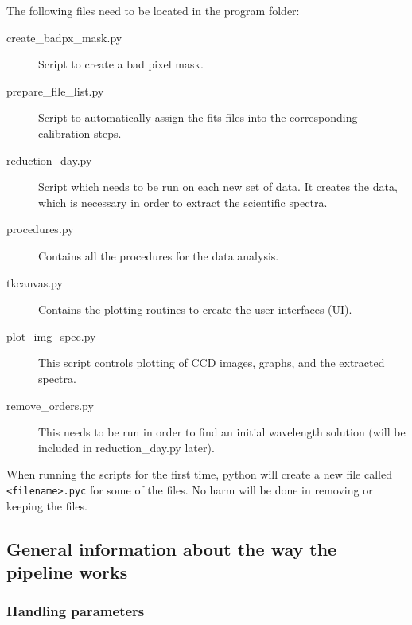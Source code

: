 \documentclass[10pt,a4paper]{article}
\begin{document}
\noindent The following files need to be located in the program folder:
\begin{description}
\item[create\_badpx\_mask.py] Script to create a bad pixel mask.
\item[prepare_file_list.py] Script to automatically assign the fits files into the corresponding calibration steps.
\item[reduction\_day.py] Script which needs to be run on each new set of data. It creates the data, which is necessary in order to extract the scientific spectra.
\item[procedures.py] Contains all the procedures for the data analysis.
\item[tkcanvas.py] Contains the plotting routines to create the user interfaces (UI).
\item[plot\_img\_spec.py] This script controls plotting of CCD images, graphs, and the extracted spectra.
\item[remove\_orders.py] This needs to be run in order to find an initial wavelength solution (will be included in reduction\_day.py later).
\end{description}

When running the scripts for the first time, python will create a new file called \verb|<filename>.pyc| for some of the files. No harm will be done in removing or keeping the files.


\subsection{General information about the way the pipeline works}

\subsubsection*{Handling parameters}
\end{document}
